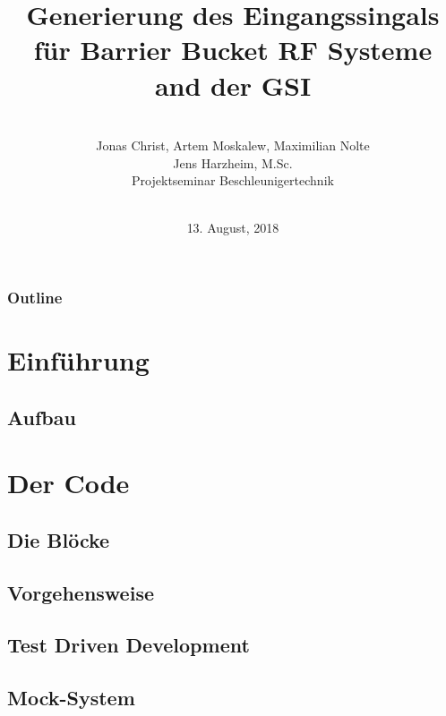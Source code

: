 \documentclass[colorbacktitle,inverttitle,landscape,presentation,
	english,
	aspectratio=43, %
	accentcolor=tud9b, %
]{tudbeamer}
\date{13. August, 2018}
\title{Generierung des Eingangssingals für Barrier Bucket RF Systeme and der GSI }
\subtitle{\\[0.3\baselineskip]
	Jonas Christ, Artem Moskalew, Maximilian Nolte \\
{\small Jens Harzheim, M.Sc.}\\
[0.3\baselineskip]
{\tiny Projektseminar Beschleunigertechnik}\\[0.3em]
	\mbox{\scriptsize}~}
\institute[TU Darmstadt | Fachbereich 18 | Institut Theorie Elektromagnetischer Felder]{Institut für Theorie Elektromagnetischer Felder, TU Darmstadt}
\begin{document}
	
\begin{titleframe}
	\end{titleframe}
	
\begin{frame}
	\frametitle{Outline}
	\tableofcontents%
\end{frame}
	

\section{Einführung}



\subsection{Aufbau}




\section{Der Code}
\subsection{Die Blöcke}

\subsection{Vorgehensweise}

\subsection{Test Driven Development}

\subsection{Mock-System}

\end{document}
